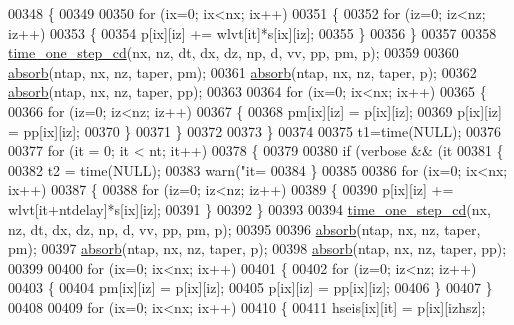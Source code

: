 \begin{DoxyCode}
{{{{{{{{{{{{{{00348     \{
00349 
00350         \textcolor{keywordflow}{for} (ix=0; ix<nx; ix++)
00351         \{
00352             \textcolor{keywordflow}{for} (iz=0; iz<nz; iz++)
00353             \{
00354                 p[ix][iz] += wlvt[it]*s[ix][iz];
00355             \}
00356         \}
00357 
00358         \hyperlink{a00002_a335451e1ec7e61be5649569b8d4b3a3c}{time\_one\_step\_cd}(nx, nz, dt, dx, dz, np, d, vv, pp, pm, p);
00359 
00360         \hyperlink{a00002_a707cef9b52a1fbb50f69a5bdcdc504fe}{absorb}(ntap, nx, nz, taper, pm);
00361         \hyperlink{a00002_a707cef9b52a1fbb50f69a5bdcdc504fe}{absorb}(ntap, nx, nz, taper, p);
00362         \hyperlink{a00002_a707cef9b52a1fbb50f69a5bdcdc504fe}{absorb}(ntap, nx, nz, taper, pp);
00363 
00364         \textcolor{keywordflow}{for} (ix=0; ix<nx; ix++)
00365         \{
00366             \textcolor{keywordflow}{for} (iz=0; iz<nz; iz++)
00367             \{
00368                 pm[ix][iz] = p[ix][iz];
00369                 p[ix][iz] = pp[ix][iz];
00370             \}
00371         \}
00372 
00373     \}
00374 
00375     t1=time(NULL);
00376 
00377     \textcolor{keywordflow}{for} (it = 0; it < nt; it++)
00378     \{
00379 
00380         \textcolor{keywordflow}{if} (verbose && (it%
00381         \{
00382             t2 = time(NULL);
00383             warn(\textcolor{stringliteral}{"it=%
00384         \}
00385 
00386         \textcolor{keywordflow}{for} (ix=0; ix<nx; ix++)
00387         \{
00388             \textcolor{keywordflow}{for} (iz=0; iz<nz; iz++)
00389             \{
00390                 p[ix][iz] += wlvt[it+ntdelay]*s[ix][iz];
00391             \}
00392         \}
00393 
00394         \hyperlink{a00002_a335451e1ec7e61be5649569b8d4b3a3c}{time\_one\_step\_cd}(nx, nz, dt, dx, dz, np, d, vv, pp, pm, p);
00395 
00396         \hyperlink{a00002_a707cef9b52a1fbb50f69a5bdcdc504fe}{absorb}(ntap, nx, nz, taper, pm);
00397         \hyperlink{a00002_a707cef9b52a1fbb50f69a5bdcdc504fe}{absorb}(ntap, nx, nz, taper, p);
00398         \hyperlink{a00002_a707cef9b52a1fbb50f69a5bdcdc504fe}{absorb}(ntap, nx, nz, taper, pp);
00399 
00400         \textcolor{keywordflow}{for} (ix=0; ix<nx; ix++)
00401         \{
00402             \textcolor{keywordflow}{for} (iz=0; iz<nz; iz++)
00403             \{
00404                 pm[ix][iz] = p[ix][iz];
00405                 p[ix][iz] = pp[ix][iz];
00406             \}
00407         \}
00408 
00409         \textcolor{keywordflow}{for} (ix=0; ix<nx; ix++)
00410         \{
00411             hseis[ix][it] = p[ix][izhsz];
}}}}}}}}}}}}}}}
\end{DoxyCode}
